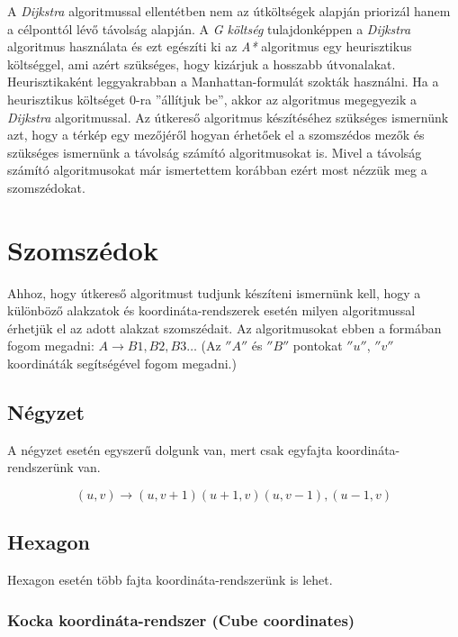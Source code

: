 \noindent A \textit{Dijkstra} algoritmussal ellentétben nem az útköltségek alapján priorizál hanem a célponttól lévő távolság alapján.
\newline
\newline A \textit{G költség} tulajdonképpen a \textit{Dijkstra} algoritmus használata és ezt egészíti ki az \textit{A*} algoritmus egy heurisztikus költséggel, ami azért szükséges, hogy kizárjuk a hosszabb útvonalakat. Heurisztikaként leggyakrabban a Manhattan-formulát szokták használni. Ha a heurisztikus költséget 0-ra ''állítjuk be'', akkor az algoritmus megegyezik a \textit{Dijkstra} algoritmussal.
\newline
\newline Az útkereső algoritmus készítéséhez szükséges ismernünk azt, hogy a térkép egy mezőjéről hogyan érhetőek el a szomszédos mezők és szükséges ismernünk a távolság számító algoritmusokat is. Mivel a távolság számító algoritmusokat már ismertettem korábban ezért most nézzük meg a szomszédokat.

\section{Szomszédok}

Ahhoz, hogy útkereső algoritmust tudjunk készíteni ismernünk kell, hogy a különböző alakzatok és koordináta-rendszerek esetén milyen algoritmussal érhetjük el az adott alakzat szomszédait. 
\newline
\newline Az algoritmusokat ebben a formában fogom megadni: $A \rightarrow B1, B2, B3 …$
(Az $''A''$ és $''B''$ pontokat $''u''$, $''v''$ koordináták segítségével fogom megadni.)

\subsection{Négyzet}
A négyzet esetén egyszerű dolgunk van, mert csak egyfajta koordináta-rendszerünk van.

$$
(u,v) \rightarrow (u,v+1) (u+1,v) (u,v-1), (u-1,v)
$$

\subsection{Hexagon}

Hexagon esetén több fajta koordináta-rendszerünk is lehet.

\subsubsection{Kocka koordináta-rendszer (Cube coordinates)}

